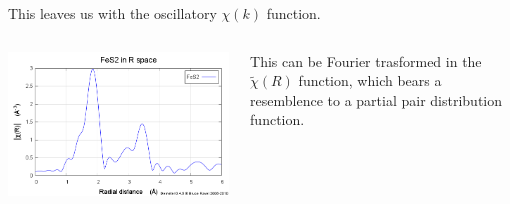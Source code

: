 \documentclass[10pt, xcolor=x11names, compress, handout]{beamer}
\begin{document}
\begin{frame}
\begin{columns}
\begin{column}{0.65\linewidth}
      This leaves us with the oscillatory $\chi(k)$ function.
    \end{column}
  \end{columns}
  \begin{columns}
    \begin{column}{0.35\linewidth}
      \includegraphics[width=\linewidth]{JM/fes2_chir.png}
    \end{column}
    \begin{column}{0.65\linewidth}
      \small
      This can be Fourier trasformed in the $\tilde\chi(R)$ function,
      which bears a resemblence to a partial pair distribution
      function.
    \end{column}
  \end{columns}
\end{frame}
\end{document}
